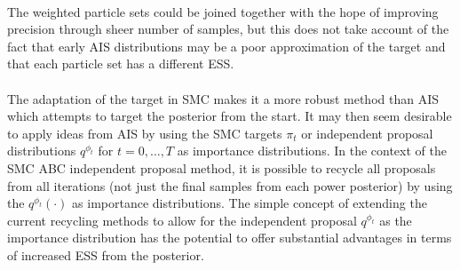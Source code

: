 \documentclass[12,fleqn]{article}
\theoremstyle{definition}
\theoremstyle{plain}
\begin{document}
\paragraph{}
The weighted particle sets could be joined together with the hope of improving precision through sheer number of samples, but this does not take account of the fact that early AIS distributions may be a poor approximation of the target and that each particle set has a different ESS. 
\par



\paragraph{}
The adaptation of the target in SMC makes it a more robust method than AIS which attempts to target the posterior from the start. It may then seem desirable to apply ideas from AIS by using the SMC targets $\pi_t$ or independent proposal distributions $q^{\phi_t}$ for $t = 0, \ldots , T$ as importance distributions. In the context of the SMC ABC independent proposal method, it is possible to recycle all proposals from all iterations (not just the final samples from each power posterior) by using the $q^{\phi_t}(\cdot)$ as importance distributions. The simple concept of extending the current recycling methods to allow for the independent proposal $q^{\phi_t}$ as the importance distribution has the potential to offer substantial advantages in terms of increased ESS from the posterior.
\par
\end{document}
